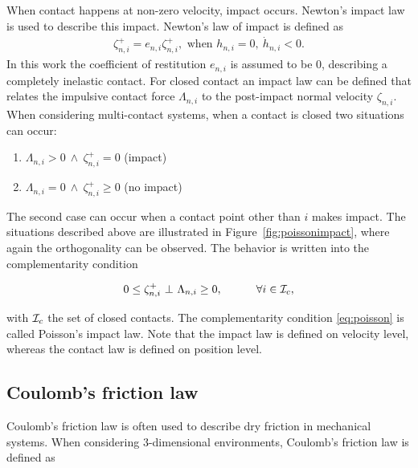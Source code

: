 \documentclass[DC2017114Bouma.tex]{subfiles}
\begin{document}
When contact happens at non-zero velocity, impact occurs. Newton's impact law is used to describe this impact. Newton's law of impact is defined as
\begin{align}
\zeta^+_{n,i} = e_{n,i}\zeta^+_{n,i},\text{ when }h_{n,i}=0,\ \dot{h}_{n,i}<0.
\end{align}
In this work the coefficient of restitution $e_{n,i}$ is assumed to be $0$, describing a completely inelastic contact. For closed contact an impact law can be defined that relates the impulsive contact force $\Lambda_{n,i}$ to the post-impact normal velocity $\zeta_{n,i}$. When considering multi-contact systems, when a contact is closed two situations can occur:
\begin{enumerate}
\item $\Lambda_{n,i} > 0\ \wedge\ \zeta^+_{n,i} = 0$ (impact)
\item $\Lambda_{n,i} = 0\ \wedge\ \zeta^+_{n,i} \geq 0$ (no impact)
\end{enumerate}
The second case can occur when a contact point other than $i$ makes impact. The situations described above are illustrated in Figure~\ref{fig:poissonimpact}, where again the orthogonality can be observed. The behavior is written into the complementarity condition

\begin{align}
0\leq \zeta^+_{n,i}\ \bot\ \Lambda_{n,i} \geq 0,\quad  \qquad \forall i\in\mathcal{I}_c,\label{eq:poisson}
\end{align}

with $\mathcal{I}_c$ the set of closed contacts. The complementarity condition \eqref{eq:poisson} is called Poisson's impact law. Note that the impact law is defined on velocity level, whereas the contact law is defined on position level.
\subsection{Coulomb's friction law}
Coulomb's friction law is often used to describe dry friction in mechanical systems. When considering 3-dimensional environments, Coulomb's friction law is defined as 
\end{document}
